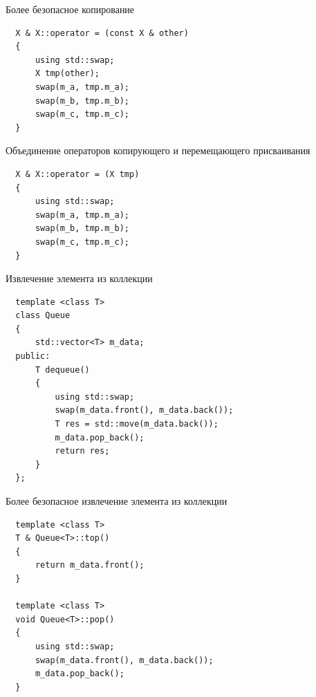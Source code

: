 \documentclass[unknownkeysallowed,xcolor=table]{beamer}
\begin{document}
\begin{frame}[fragile]{Более безопасное копирование}
  \begin{lstlisting}
  X & X::operator = (const X & other)
  {
      using std::swap;
      X tmp(other);
      swap(m_a, tmp.m_a);
      swap(m_b, tmp.m_b);
      swap(m_c, tmp.m_c);
  }
  \end{lstlisting}
\end{frame}

\begin{frame}[fragile]{Объединение операторов копирующего и перемещающего присваивания}
  \begin{lstlisting}
  X & X::operator = (X tmp)
  {
      using std::swap;
      swap(m_a, tmp.m_a);
      swap(m_b, tmp.m_b);
      swap(m_c, tmp.m_c);
  }
  \end{lstlisting}
\end{frame}

\begin{frame}[fragile]{Извлечение элемента из коллекции}
  \begin{lstlisting}
  template <class T>
  class Queue
  {
      std::vector<T> m_data;
  public:
      T dequeue()
      {
          using std::swap;
          swap(m_data.front(), m_data.back());
          T res = std::move(m_data.back());
          m_data.pop_back();
          return res;
      }
  };
  \end{lstlisting}
\end{frame}

\begin{frame}[fragile]{Более безопасное извлечение элемента из коллекции}
  \begin{lstlisting}
  template <class T>
  T & Queue<T>::top()
  {
      return m_data.front();
  }

  template <class T>
  void Queue<T>::pop()
  {
      using std::swap;
      swap(m_data.front(), m_data.back());
      m_data.pop_back();
  }
  \end{lstlisting}
\end{frame}
\end{document}
